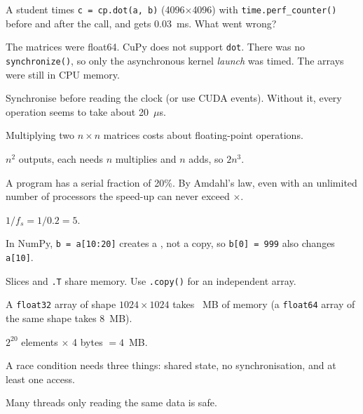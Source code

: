 \documentclass[addpoints,11pt]{exam}
\newcommand{\q}{\Needspace{7\baselineskip}\question}
\newcommand{\blank}[2]{\hspace{0pt}\fillin[#1][#2]\hspace{0pt}}
\begin{document}
\begin{questions}
\q[4]
A student times \texttt{c = cp.dot(a, b)} (4096$\times$4096) with \texttt{time.perf\_counter()} before
and after the call, and gets 0.03~ms. What went wrong?
\begin{choices}
  \choice The matrices were float64.
  \choice CuPy does not support \texttt{dot}.
  \CorrectChoice There was no \texttt{synchronize()}, so only the asynchronous kernel \emph{launch} was timed.
  \choice The arrays were still in CPU memory.
\end{choices}
\begin{solution}Synchronise before reading the clock (or use CUDA events). Without it, every operation seems to take about 20~$\mu$s.\end{solution}


\q[4]
Multiplying two $n\times n$ matrices costs about \blank{$2n^3$}{1.2in} floating-point operations.
\begin{solution}$n^2$ outputs, each needs $n$ multiplies and $n$ adds, so $2n^3$.\end{solution}

\q[4]
A program has a serial fraction of 20\%. By Amdahl's law, even with an unlimited number of processors
the speed-up can never exceed \blank{5}{0.8in}$\times$.
\begin{solution}$1/f_s = 1/0.2 = 5$.\end{solution}

\q[4]
In NumPy, \texttt{b = a[10:20]} creates a \blank{view}{1.2in}, not a copy, so \texttt{b[0] = 999}
also changes \texttt{a[10]}.
\begin{solution}Slices and \texttt{.T} share memory. Use \texttt{.copy()} for an independent array.\end{solution}

\q[4]
A \texttt{float32} array of shape $1024\times 1024$ takes \blank{4}{0.8in}~MB of memory
(a \texttt{float64} array of the same shape takes 8~MB).
\begin{solution}$2^{20}$ elements $\times$ 4 bytes $=4$~MB.\end{solution}

\q[4]
A race condition needs three things: shared state, no synchronisation, and at least one
\blank{write}{1in} access.
\begin{solution}Many threads only reading the same data is safe.\end{solution}


\end{questions}
\end{document}
